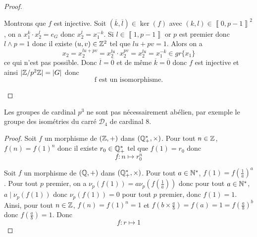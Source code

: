 \documentclass[12pt]{article}
\begin{document}
\begin{proof}
\begin{enumerate}
		Montrons que $f$ est injective. Soit $(\overline{k},\overline{l})\in\ker(f)$ avec $(k,l)\in\left\llbracket 0,p-1\right\rrbracket^{2}$, on a $x_{1}^{k}\cdot x_{2}^{l}=e_{G}$ donc $x_{2}^{l}=x_{1}^{-k}$. Si $l\in\left\llbracket 1,p-1\right\rrbracket$ or $p$ est premier donc $l\wedge p=1$ donc il existe $(u,v)\in\mathbb{Z}^{2}$ tel que $lu+pv=1$. Alors on a 
		\begin{equation}
			x_{2}=x_{2}^{lu+pv}=x_{2}^{lu}\cdot x_{2}^{pv}=x_{2}^{lu}=x_{1}^{-k}\in gr\{x_{1}\}
		\end{equation} ce qui n'est pas possible. Donc $\overline{l}=\overline{0}$ et de même $\overline{k}=\overline{0}$ donc $f$ est injective et ainsi 
		$\vert\mathbb{Z}/p^{2}\mathbb{Z}\vert=\vert G\vert$ donc 
		\begin{equation}
			\boxed{\text{f est un isomorphisme.}}
		\end{equation}
	\end{enumerate}
\end{proof}

\begin{remark}
	Les groupes de cardinal $p^{3}$ ne sont pas nécessairement abélien, par exemple le groupe des isométries du carré $\mathcal{D}_{4}$ de cardinal 8.
\end{remark}

\begin{proof}
	Soit $f$ un morphisme de $(\mathbb{Z},+)$ dans $(\mathbb{Q}_{+}^{*},\times)$. Pour tout $n\in\mathbb{Z}$, $f(n)=f(1)^{n}$ donc il existe $r_{0}\in\mathbb{Q}_{+}^{*}$ tel que $f(1)=r_{0}$ donc 
	\begin{equation}
		\boxed{f\colon n\mapsto r_{0}^{n}}
	\end{equation}

	Soit $f$ un morphisme de $(\mathbb{Q},+)$ dans $(\mathbb{Q}_{+}^{*},\times)$. Pour tout $a\in\mathbb{N}^{*}$, $f(1)=f(\frac{1}{a})^{a}$. Pour tout $p$ premier, on a $\nu_{p}(f(1))=a\nu_{p}(f(\frac{1}{a}))$ donc pour tout $a\in\mathbb{N}^{*}$, $a\mid\nu_{p}(f(1))$ donc $\nu_{p}(f(1))=0$ pour tout $p$ premier, donc $f(1)=1$. Ainsi, pour tout $n\in\mathbb{Z}$, $f(n)=f(1)^{n}=1$ et $f(b\times\frac{a}{b})=f(a)=1=f(\frac{a}{b})^{b}$ donc $f(\frac{a}{b})=1$. Donc 
	\begin{equation}
		\boxed{f\colon r\mapsto 1}
	\end{equation}
\end{proof}
\end{document}
